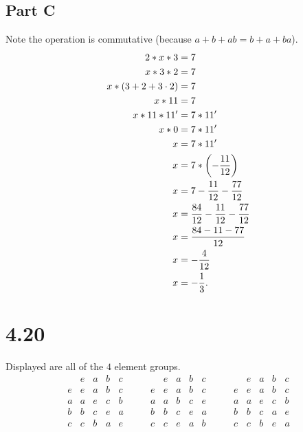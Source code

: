 \documentclass[12pt]{extarticle}
\begin{document}
\subsection*{Part C}
Note the operation is commutative (because $a + b + ab = b + a + ba$).
\begin{align*}
	2 * x * 3 &= 7 \\
	x * 3 * 2 &= 7 \\
	x * (3 + 2 + 3\cdot 2) &= 7 \\
	x * 11 &= 7 \\
	x * 11 * 11' &= 7 * 11' \\
	x * 0 &= 7 * 11' \\
	x &= 7 * 11' \\
	x &= 7 * \qty(-\frac{11}{12}) \\
	x &= 7 - \frac{11}{12} - \frac{77}{12} \\
	x &= \frac{84}{12} - \frac{11}{12} - \frac{77}{12} \\
	x &= \frac{84 - 11 - 77}{12} \\
	x &= -\frac{4}{12} \\
	x &= -\frac{1}{3}
.\end{align*}

\section*{4.20}
Displayed are all of the $4$ element groups.
\[
	\begin{array}{c|c|c|c|c}
			& e & a & b & c \\\hline
		e & e & a & b & c \\\hline
		a & a & e & c & b \\\hline
		b & b & c & e & a \\\hline
		c & c & b & a & e 
	\end{array}
	\qquad
	\begin{array}{c|c|c|c|c}
			& e & a & b & c \\\hline
		e & e & a & b & c \\\hline
		a & a & b & c & e \\\hline
		b & b & c & e & a \\\hline
		c & c & e & a & b 
	\end{array}
	\qquad
	\begin{array}{c|c|c|c|c}
			& e & a & b & c \\\hline
		e & e & a & b & c \\\hline
		a & a & e & c & b \\\hline
		b & b & c & a & e \\\hline
		c & c & b & e & a 
	\end{array}
\]
\end{document}
